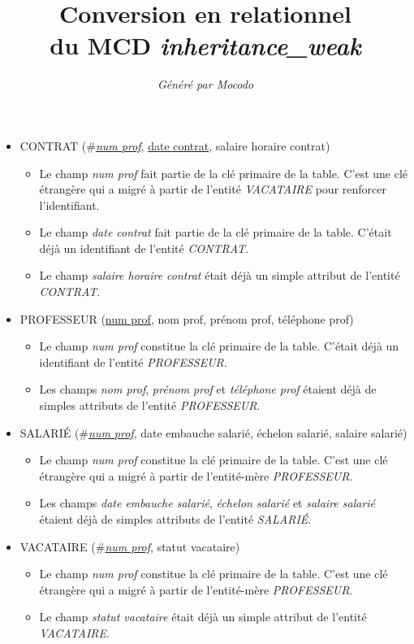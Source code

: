 \documentclass[a4paper]{article}
\title{Conversion en relationnel\\du MCD \emph{inheritance\_weak}}
\author{\emph{Généré par Mocodo}}
\newcommand{\relat}[1]{\textsc{#1}}
\newcommand{\attr}[1]{#1}
\newcommand{\prim}[1]{\uline{#1}}
\newcommand{\foreign}[1]{\#\textsl{#1}}
\begin{document}
\maketitle

\begin{itemize}
  \item \relat{CONTRAT} (\foreign{\prim{num prof}}, \prim{date contrat}, \attr{salaire horaire contrat})
  \begin{itemize}
    \item Le champ \emph{num prof} fait partie de la clé primaire de la table. C'est une clé étrangère qui a migré à partir de l'entité \emph{VACATAIRE} pour renforcer l'identifiant.
    \item Le champ \emph{date contrat} fait partie de la clé primaire de la table. C'était déjà un identifiant de l'entité \emph{CONTRAT}.
    \item Le champ \emph{salaire horaire contrat} était déjà un simple attribut de l'entité \emph{CONTRAT}.
  \end{itemize}

  \item \relat{PROFESSEUR} (\prim{num prof}, \attr{nom prof}, \attr{prénom prof}, \attr{téléphone prof})
  \begin{itemize}
    \item Le champ \emph{num prof} constitue la clé primaire de la table. C'était déjà un identifiant de l'entité \emph{PROFESSEUR}.
    \item Les champs \emph{nom prof}, \emph{prénom prof} et \emph{téléphone prof} étaient déjà de simples attributs de l'entité \emph{PROFESSEUR}.
  \end{itemize}

  \item \relat{SALARIÉ} (\foreign{\prim{num prof}}, \attr{date embauche salarié}, \attr{échelon salarié}, \attr{salaire salarié})
  \begin{itemize}
    \item Le champ \emph{num prof} constitue la clé primaire de la table. C'est une clé étrangère qui a migré à partir de l'entité-mère \emph{PROFESSEUR}.
    \item Les champs \emph{date embauche salarié}, \emph{échelon salarié} et \emph{salaire salarié} étaient déjà de simples attributs de l'entité \emph{SALARIÉ}.
  \end{itemize}

  \item \relat{VACATAIRE} (\foreign{\prim{num prof}}, \attr{statut vacataire})
  \begin{itemize}
    \item Le champ \emph{num prof} constitue la clé primaire de la table. C'est une clé étrangère qui a migré à partir de l'entité-mère \emph{PROFESSEUR}.
    \item Le champ \emph{statut vacataire} était déjà un simple attribut de l'entité \emph{VACATAIRE}.
  \end{itemize}

\end{itemize}
\end{document}
